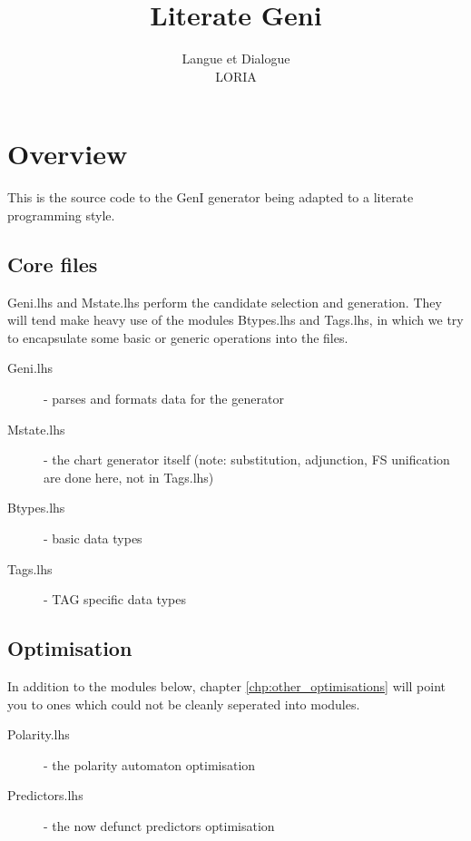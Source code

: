 \documentclass[11pt]{report}
\begin{document}
\title{Literate Geni}
\author{Langue et Dialogue\\LORIA}

\maketitle
\tableofcontents


\chapter{Overview}

This is the source code to the GenI generator being adapted to a
literate programming style.  

\section{Core files}

Geni.lhs and Mstate.lhs perform the candidate selection and generation.
They will tend make heavy use of the modules Btypes.lhs and Tags.lhs, in
which we try to encapsulate some basic or generic operations into the
files.

\begin{description}
 \item[Geni.lhs] - parses and formats data for the generator 
 \item[Mstate.lhs] - the chart generator itself (note: substitution,
 adjunction, FS unification are done here, not in Tags.lhs)
 \item[Btypes.lhs] - basic data types 
 \item[Tags.lhs] - TAG specific data types
\end{description}

\section{Optimisation}

In addition to the modules below, chapter \ref{chp:other_optimisations}
will point you to ones which could not be cleanly seperated into
modules.

\begin{description}
 \item[Polarity.lhs] - the polarity automaton optimisation 
 \item[Predictors.lhs] - the now defunct predictors optimisation
\end{description}
\end{document}
